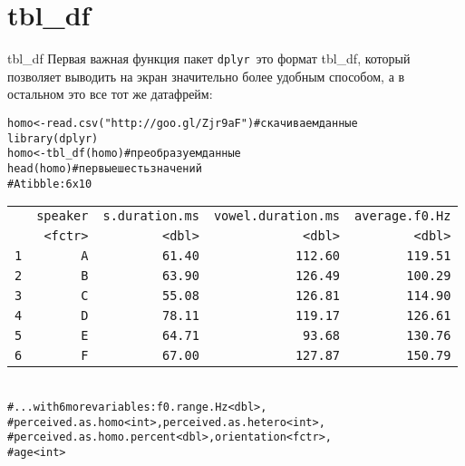 \section{tbl\_df}
\begin{frame}{tbl\_df}
Первая важная функция пакет \scriptsize\verb"dplyr"\normalsize\ это формат tbl\_df, который позволяет выводить на экран значительно более удобным способом, а в остальном это все тот же датафрейм:\\
\vfill
\scriptsize
\begin{alltt}
homo <- read.csv("http://goo.gl/Zjr9aF") \hfill \# скачиваем данные \medskip\\
\alert{library(dplyr)}
homo <- \alert{tbl\_df(}homo\alert{)} \hfill \# преобразуем данные \\
head(homo) \hfill \# первые шесть значений \\
\vfill
\# A tibble: 6 x 10\\
\begin{tabular}{rrrrr}
 & speaker & s.duration.ms & vowel.duration.ms & average.f0.Hz \\ 
 & <fctr> & <dbl> & <dbl> & <dbl> \\ 
1 & A & 61.40 & 112.60 & 119.51  \\ 
2 & B & 63.90 & 126.49 & 100.29  \\ 
3 & C & 55.08 & 126.81 & 114.90 \\ 
4 & D & 78.11 & 119.17 & 126.61 \\ 
5 & E & 64.71 & 93.68 & 130.76  \\ 
6 & F & 67.00 & 127.87 & 150.79 \\ 
\end{tabular}
\\
\# ... with 6 more variables: f0.range.Hz <dbl>, \\
\#   perceived.as.homo <int>, perceived.as.hetero <int>, \\
\#   perceived.as.homo.percent <dbl>, orientation <fctr>, \\
\#   age <int>
\end{alltt}
\normalsize
\end{frame}

